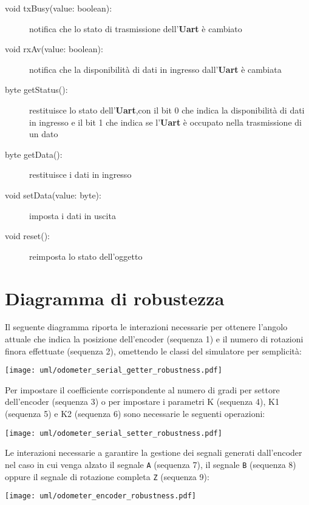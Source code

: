 \documentclass [11pt,a4paper,oneside]{paper}
\newcommand{\component}[1]{\textbf{#1}}
\newcommand{\identifier}[1]{\texttt{#1}}
\begin{document}
\begin{description}
\item[void txBusy(value: boolean):] notifica che lo stato di trasmissione
    dell'\component{Uart} è cambiato
\item[void rxAv(value: boolean):] notifica che la disponibilità di dati
    in ingresso dall'\component{Uart} è cambiata
\item[byte getStatus():] restituisce lo stato dell'\component{Uart},con il
    bit 0 che indica la disponibilità di dati in ingresso e il bit 1 che
    indica se l'\component{Uart} è occupato nella trasmissione di un dato
\item[byte getData():] restituisce i dati in ingresso
\item[void setData(value: byte):] imposta i dati in uscita
\item[void reset():] reimposta lo stato dell'oggetto
\end{description}

\section{Diagramma di robustezza}
Il seguente diagramma riporta le interazioni necessarie per ottenere
l'angolo attuale che indica la posizione dell'encoder (sequenza 1) e
il numero di rotazioni finora effettuate (sequenza 2), omettendo
le classi del simulatore per semplicità:
\begin{center}
    \texttt{[image: uml/odometer\_serial\_getter\_robustness.pdf]}
    \label{serial_getter_robustness}
\end{center}

Per impostare il coefficiente corrispondente al numero di gradi per settore
dell'encoder (sequenza 3) o per impostare i parametri K (sequenza 4), K1
(sequenza 5) e K2 (sequenza 6) sono necessarie le seguenti operazioni:
\begin{center}
    \texttt{[image: uml/odometer\_serial\_setter\_robustness.pdf]}
    \label{serial_getter_robustness}
\end{center}

Le interazioni necessarie a garantire la gestione dei segnali
generati dall'encoder nel caso in cui venga alzato il segnale
\identifier{A} (sequenza 7), il segnale \identifier{B} (sequenza 8)
oppure il segnale di rotazione completa \identifier{Z} (sequenza 9):

\begin{center}
    \texttt{[image: uml/odometer\_encoder\_robustness.pdf]}
    \label{encoder_robustness}
\end{center}
\end{document}
